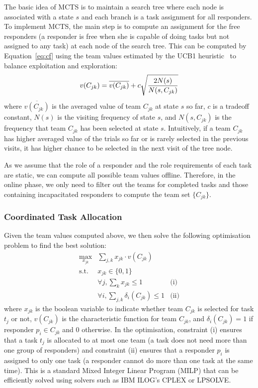 The basic idea of MCTS is to maintain a search tree where each node
is associated with a state $s$ and each branch is a task assignment
for all responders. To implement MCTS, the main step is to compute
an assignment for the free responders (a responder is free when she
is capable of doing tasks but not assigned to any task) at each
node of the search tree. This can be computed by
Equation~\ref{eq:cf} using the team values estimated by the UCB1
heuristic~\cite{auer2002finite} to balance exploitation and
exploration:
\begin{equation}\small
  v(C_{jk}) = \overline{v(C_{jk})} + c\sqrt{\frac{2N(s)}{N(s, C_{jk})}}
\end{equation}
where $\overline{v(C_{jk})}$ is the averaged value of team $C_{jk}$
at state $s$ so far, $c$ is a tradeoff constant, $N(s)$ is the
visiting frequency of state $s$, and $N(s, C_{jk})$ is the
frequency that team $C_{jk}$ has been selected at state $s$.
Intuitively, if a team $C_{jk}$ has higher averaged value of the
trials so far or is rarely selected in the previous visits, it has
higher chance to be selected in the next visit of the tree node.

As we assume that the role of a responder and the role requirements
of each task are static, we can compute all possible team values
offline. Therefore, in the online phase, we only need to filter out
the teams for completed tasks and those containing
incapacitated responders to compute the team set $\{ C_{jk} \}$.

\subsubsection{Coordinated Task Allocation}
\noindent Given the team values computed above, we then solve the
following optimisation problem to find the best solution:
\begin{equation}
  \begin{array}{lll}
    \max\limits_{x_{jk}} & \sum_{j, k} x_{jk} \cdot v(C_{jk}) & \\[2pt]
    \mbox{s.t.} & x_{jk} \in \{0, 1\} & \\[2pt]
    & \forall j, \sum_{k} x_{jk} \leq 1 & \mbox{(i)} \\[2pt]
    & \forall i, \sum_{j, k} \delta_i(C_{jk}) \leq 1 & \mbox{(ii)}
  \end{array}
  \label{eq:cf}
\end{equation}
where $x_{jk}$ is the boolean variable to indicate whether team
$C_{jk}$ is selected for task $t_j$ or not, $v(C_{jk})$ is the
characteristic function for team $C_{jk}$, and $\delta_i(C_{jk}) =
1$ if responder $p_i\in C_{jk}$ and 0 otherwise. In the
optimisation, constraint (i) ensures that a task $t_j$ is allocated
to at most one team (a task does not need more than one group of
responders) and constraint (ii) ensures that a responder $p_i$ is
assigned to only one task (a responder cannot do more than one task
at the same time). This is a standard Mixed Integer Linear Program
(MILP) that can be efficiently solved  using solvers such as IBM
ILOG's CPLEX or LPSOLVE.

